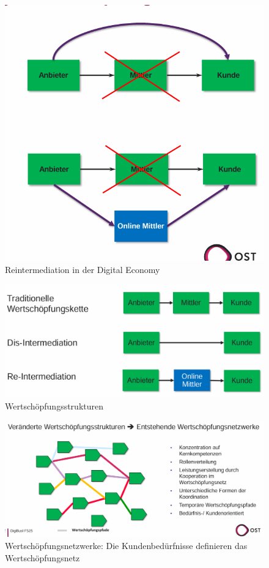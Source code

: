 \documentclass[../Main.tex]{subfiles}
\begin{document}
\begin{figure}[H]
    \centering
    \includegraphics[width=1\linewidth]{Images/digbus/reintermediation.png}
    \caption{Reintermediation in der Digital Economy}
\end{figure}

\begin{figure}[H]
    \centering
    \includegraphics[width=1\linewidth]{Images/digbus/wertschoepfung.png}
    \caption{Wertschöpfungsstrukturen}
\end{figure}

\begin{figure}[H]
    \centering
    \includegraphics[width=1\linewidth]{Images/digbus/wertnetze.png}
    \caption{Wertschöpfungsnetzwerke: Die Kundenbedürfnisse 
    definieren das Wertschöpfungsnetz}
\end{figure}
\end{document}
